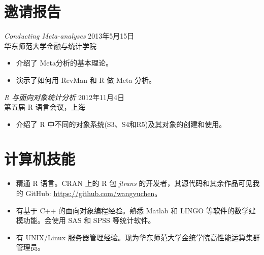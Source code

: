 \documentclass[margin]{res}
\begin{document}
\begin{resume}
		
		\section{邀请报告}
		{\sl Conducting Meta-analyses} \hfill 2013年5月15日\\
		华东师范大学金融与统计学院
		\begin{itemize}  \itemsep -2pt %
			\item 介绍了 Meta分析的基本理论。
			\item 演示了如何用 RevMan 和 R 做 Meta 分析。
		\end{itemize}
		
		{\sl R 与面向对象统计分析} \hfill 2012年11月4日\\
		第五届 R 语言会议，上海
		\begin{itemize}  \itemsep -2pt %
			\item 介绍了 R 中不同的对象系统(S3、S4和R5)及其对象的创建和使用。
		\end{itemize} 
		
		
		\section{计算机技能}
		\begin{itemize}  \itemsep -2pt %
			\item  精通 R 语言。CRAN 上的 R 包 \emph{jtrans} 的开发者，其源代码和其余作品可见我的 GitHub: \url{https://github.com/wangyuchen}。 
			\item  有基于 C++ 的面向对象编程经验。熟悉 Matlab 和 LINGO 等软件的数学建模功能。会使用 SAS 和 SPSS 等统计软件。
			\item 有 UNIX/Linux 服务器管理经验。现为华东师范大学金统学院高性能运算集群管理员。
		\end{itemize}
		

\end{resume}
\end{document}
